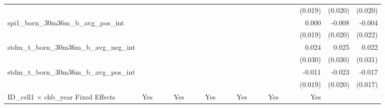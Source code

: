\begin{tabular}{lrrrrrrrrrrrrrrrrrr}
                                            &              &              &              &              &              &              &              &              &               &              &              &               &              &              &               &      (0.019) &      (0.020) &       (0.020) \\ 
spi1\_born\_30m36m\_b\_avg\_pos\_int        &              &              &              &              &              &              &              &              &               &              &              &               &              &              &               &        0.000 &       -0.008 &        -0.004 \\ 
                                            &              &              &              &              &              &              &              &              &               &              &              &               &              &              &               &      (0.019) &      (0.020) &       (0.022) \\ 
stdm\_t\_born\_30m36m\_b\_avg\_neg\_int     &              &              &              &              &              &              &              &              &               &              &              &               &              &              &               &        0.024 &        0.025 &         0.022 \\ 
                                            &              &              &              &              &              &              &              &              &               &              &              &               &              &              &               &      (0.030) &      (0.030) &       (0.031) \\ 
stdm\_t\_born\_30m36m\_b\_avg\_pos\_int     &              &              &              &              &              &              &              &              &               &              &              &               &              &              &               &       -0.011 &       -0.023 &        -0.017 \\ 
                                            &              &              &              &              &              &              &              &              &               &              &              &               &              &              &               &      (0.019) &      (0.020) &       (0.017) \\ 
\midrule
ID\_cell1 $\times$ chb\_year Fixed Effects  &          Yes &              &              &          Yes &              &              &          Yes &              &               &          Yes &              &               &          Yes &              &               &          Yes &              &               \\ 

\end{tabular}
